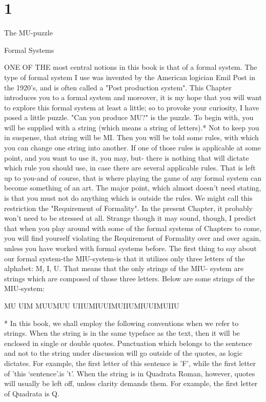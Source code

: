 \chapter {1}




The MU-puzzle 

Formal Systems 

ONE OF THE most central notions in this book is that of a formal system. The type of formal system I use was invented by the American logician Emil Post in the 1920's, and is often called a "Post production system". This Chapter introduces you to a formal system and moreover, it is my hope that you will want to explore this formal system at least a little; so to provoke your curiosity, I have posed a little puzzle. "Can you produce MU?" is the puzzle. To begin with, you will be supplied with a string (which means a string of letters).* Not to keep you in suspense, that string will be MI. Then you will be told some rules, with which you can change one string into another. If one of those rules is applicable at some point, and you want to use it, you may, but- there is nothing that will dictate which rule you should use, in case there are several applicable rules. That is left up to you-and of course, that is where playing the game of any formal system can become something of an art. The major point, which almost doesn't need stating, is that you must not do anything which is outside the rules. We might call this restriction the "Requirement of Formality". In the present Chapter, it probably won't need to be stressed at all. Strange though it may sound, though, I predict that when you play around with some of the formal systems of Chapters to come, you will find yourself violating the Requirement of Formality over and over again, unless you have worked with formal systems before. The first thing to say about our formal system-the MIU-system-is that it utilizes only three letters of the alphabet: M, I, U. That means that the only strings of the MIU- system are strings which are composed of those three letters. Below are some strings of the MIU-system: 

MU UIM MUUMUU UIIUMIUUIMUIIUMIUUIMUIIU 

* In this book, we shall employ the following conventions when we refer to strings. When the string is in the same typeface as the text, then it will be enclosed in single or double quotes. Punctuation which belongs to the sentence and not to the string under discussion will go outside of the quotes, as logic dictates. For example, the first letter of this sentence is 'F', while the first letter of 'this ‘sentence’.is 't'. When the string is in Quadrata Roman, however, quotes will usually be left off, unless clarity demands them. For example, the first letter of Quadrata is Q. 








